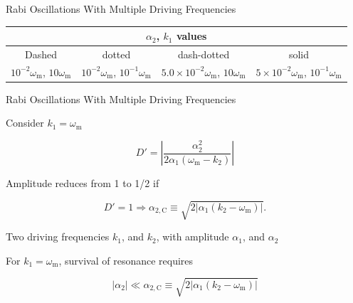 \documentclass[9pt]{beamer}
\begin{document}
\begin{darkframes}
\begin{frame}{Rabi Oscillations With Multiple Driving Frequencies}
{\tiny
\vspace{-15pt}
\begin{center}
    \begin{tabular}{c|c|c|c}
    \multicolumn{4}{c}{ $\alpha_2$, $k_1$ values} \\
    \hline
       Dashed  &  dotted & dash-dotted & solid \\
       $10^{-2}\omega_{\mathrm{m}}$, $10\omega_{\mathrm m}$  &  $10^{-2}\omega_{\mathrm{m}}$, $10^{-1}\omega_{\mathrm m}$  & $5.0\times 10^{-2}\omega_{\mathrm{m}}$, $10\omega_{\mathrm m}$  & $5\times 10^{-2}\omega_{\mathrm{m}}$, $10^{-1}\omega_{\mathrm m}$
    \end{tabular}
\end{center}
}

\end{frame}



\begin{frame}{Rabi Oscillations With Multiple Driving Frequencies}



Consider $k_1=\omega_{\mathrm m}$

\begin{equation*}
D' =  \left\vert \frac{\alpha_2^2}{2\alpha_1(\omega_{\mathrm m}-k_2)} \right\vert
\end{equation*}

Amplitude reduces from 1 to 1/2 if

\begin{equation*}
    D'=1 \Rightarrow \alpha_{2,\mathrm C} \equiv \sqrt{ 2 \lvert \alpha_1 (k_2 - \omega_{\mathrm m}) \rvert }.
\end{equation*}


\vspace{2em}

\begin{tcolorbox}
Two driving frequencies $k_1$, and $k_2$, with amplitude $\alpha_1$, and $\alpha_2$

For $k_1 = \omega_{\mathrm m}$, survival of resonance requires

\begin{equation*}
    \lvert \alpha_2\rvert \ll  \alpha_{2,\mathrm C}\equiv\sqrt{ 2 \lvert \alpha_1 (k_2 - \omega_{\mathrm m}) \rvert }
\end{equation*}

\end{tcolorbox}







\end{frame}
\end{darkframes}
\end{document}
